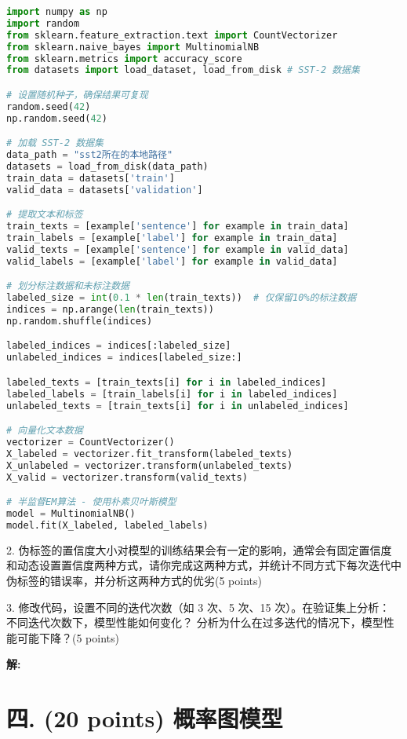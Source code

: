 \documentclass[8pt]{article}
\begin{document}
\begin{lstlisting}[language=Python, caption=半监督EM算法的实践]
import numpy as np
import random
from sklearn.feature_extraction.text import CountVectorizer
from sklearn.naive_bayes import MultinomialNB
from sklearn.metrics import accuracy_score
from datasets import load_dataset, load_from_disk # SST-2 数据集

# 设置随机种子，确保结果可复现
random.seed(42)
np.random.seed(42)

# 加载 SST-2 数据集
data_path = "sst2所在的本地路径"
datasets = load_from_disk(data_path)
train_data = datasets['train']
valid_data = datasets['validation']

# 提取文本和标签
train_texts = [example['sentence'] for example in train_data]
train_labels = [example['label'] for example in train_data]
valid_texts = [example['sentence'] for example in valid_data]
valid_labels = [example['label'] for example in valid_data]

# 划分标注数据和未标注数据
labeled_size = int(0.1 * len(train_texts))  # 仅保留10%的标注数据
indices = np.arange(len(train_texts))
np.random.shuffle(indices)

labeled_indices = indices[:labeled_size]
unlabeled_indices = indices[labeled_size:]

labeled_texts = [train_texts[i] for i in labeled_indices]
labeled_labels = [train_labels[i] for i in labeled_indices]
unlabeled_texts = [train_texts[i] for i in unlabeled_indices]

# 向量化文本数据
vectorizer = CountVectorizer()
X_labeled = vectorizer.fit_transform(labeled_texts)
X_unlabeled = vectorizer.transform(unlabeled_texts)
X_valid = vectorizer.transform(valid_texts)

# 半监督EM算法 - 使用朴素贝叶斯模型
model = MultinomialNB()
model.fit(X_labeled, labeled_labels)
\end{lstlisting}

2. 伪标签的置信度大小对模型的训练结果会有一定的影响，通常会有固定置信度和动态设置置信度两种方式，请你完成这两种方式，并统计不同方式下每次迭代中伪标签的错误率，并分析这两种方式的优劣(5 points)

3. 修改代码，设置不同的迭代次数（如 3 次、5 次、15 次）。在验证集上分析：
不同迭代次数下，模型性能如何变化？
分析为什么在过多迭代的情况下，模型性能可能下降？(5 points)

\textbf{\large 解:}
\vspace{3em}

\newpage
\section*{四. (20 points) 概率图模型}
\end{document}
